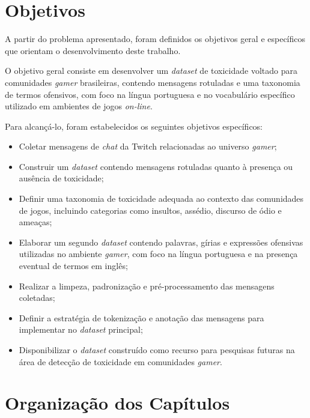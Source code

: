 \documentclass{eic-bcc-tcc}
\begin{document}
\section{Objetivos}
\label{sec:objetivos}

A partir do problema apresentado, foram definidos os objetivos geral e específicos que orientam o desenvolvimento deste trabalho.

O objetivo geral consiste em desenvolver um \textit{dataset} de toxicidade voltado para comunidades \textit{gamer} brasileiras, contendo mensagens rotuladas e uma taxonomia de termos ofensivos, com foco na língua portuguesa e no vocabulário específico utilizado em ambientes de jogos \textit{on-line}.

Para alcançá-lo, foram estabelecidos os seguintes objetivos específicos:
\begin{itemize}
    \item Coletar mensagens de \textit{chat} da Twitch relacionadas ao universo \textit{gamer};

    \item Construir um \textit{dataset} contendo mensagens rotuladas quanto à presença ou ausência de toxicidade;

    \item Definir uma taxonomia de toxicidade adequada ao contexto das comunidades de jogos, incluindo categorias como insultos, assédio, discurso de ódio e ameaças;

    \item Elaborar um segundo \textit{dataset} contendo palavras, gírias e expressões ofensivas utilizadas no ambiente \textit{gamer}, com foco na língua portuguesa e na presença eventual de termos em inglês;

    \item Realizar a limpeza, padronização e pré-processamento das mensagens coletadas;

    \item Definir a estratégia de tokenização e anotação das mensagens para implementar no \textit{dataset} principal;

    \item Disponibilizar o \textit{dataset} construído como recurso para pesquisas futuras na área de detecção de toxicidade em comunidades \textit{gamer}.
\end{itemize}

\section{Organização dos Capítulos}
\end{document}

